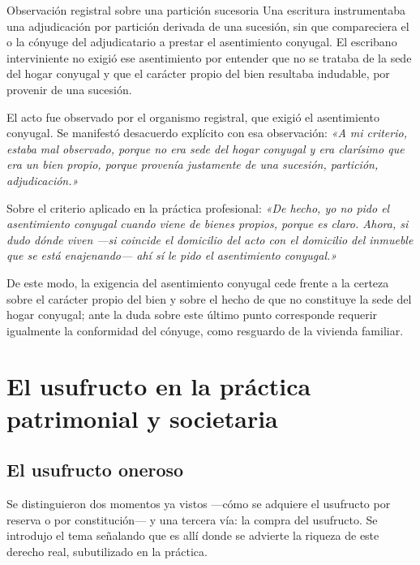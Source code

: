 \documentclass[12pt,oneside]{book}
\begin{document}
\begin{example}{Observación registral sobre una partición sucesoria}
Una escritura instrumentaba una adjudicación por partición derivada de una sucesión, sin que compareciera el o la cónyuge del adjudicatario a prestar el asentimiento conyugal. El escribano interviniente no exigió ese asentimiento por entender que no se trataba de la sede del hogar conyugal y que el carácter propio del bien resultaba indudable, por provenir de una sucesión.

El acto fue observado por el organismo registral, que exigió el asentimiento conyugal. Se manifestó desacuerdo explícito con esa observación: \textit{«A mi criterio, estaba mal observado, porque no era sede del hogar conyugal y era clarísimo que era un bien propio, porque provenía justamente de una sucesión, partición, adjudicación.»}

Sobre el criterio aplicado en la práctica profesional: \textit{«De hecho, yo no pido el asentimiento conyugal cuando viene de bienes propios, porque es claro. Ahora, si dudo dónde viven ---si coincide el domicilio del acto con el domicilio del inmueble que se está enajenando--- ahí sí le pido el asentimiento conyugal.»}
\end{example}

De este modo, la exigencia del asentimiento conyugal cede frente a la certeza sobre el carácter propio del bien y sobre el hecho de que no constituye la sede del hogar conyugal; ante la duda sobre este último punto corresponde requerir igualmente la conformidad del cónyuge, como resguardo de la vivienda familiar.

\chapter{El usufructo en la práctica patrimonial y societaria}

\section{El usufructo oneroso}

Se distinguieron dos momentos ya vistos ---cómo se adquiere el usufructo por reserva o por constitución--- y una tercera vía: la compra del usufructo. Se introdujo el tema señalando que es allí donde se advierte la riqueza de este derecho real, subutilizado en la práctica.
\end{document}
